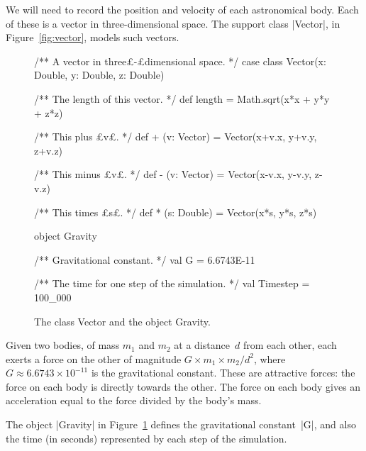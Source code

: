 We will need to record the position and velocity of each astronomical body.
Each of these is a vector in three-dimensional space.  The support class
|Vector|, in Figure~\ref{fig:vector}, models such vectors.


\begin{figure}
\begin{scala}
/** A vector in three£-£dimensional space. */
case class Vector(x: Double, y: Double, z: Double){
  /** The length of this vector. */
  def length = Math.sqrt(x*x + y*y + z*z)

  /** This plus £v£. */
  def + (v: Vector) = Vector(x+v.x, y+v.y, z+v.z)

  /** This minus £v£. */
  def - (v: Vector) = Vector(x-v.x, y-v.y, z-v.z)

  /** This times £s£. */
  def * (s: Double) = Vector(x*s, y*s, z*s)
}

object Gravity{
  /** Gravitational constant. */
  val G = 6.6743E-11

  /** The time for one step of the simulation. */
  val Timestep = 100_000
}
\end{scala}
\caption{The class {\scalashape Vector} and the object {\scalashape Gravity}.}
\label{fig:vector}\label{fig:Gravity}
\end{figure}


Given two bodies, of mass $m_1$ and $m_2$ at a distance~$d$ from each other,
each exerts a force on the other of magnitude $G \times m_1 \times m_2 / d^2$,
where $G \approx 6.6743 \times 10^{-11}$ is the gravitational constant.  These
are attractive forces: the force on each body is directly towards the other.
The force on each body gives an acceleration equal to the force divided by the
body's mass.

The object |Gravity| in Figure~\ref{fig:Gravity} defines the
gravitational constant~|G|, and also the time (in seconds) represented by each
step of the simulation. 


